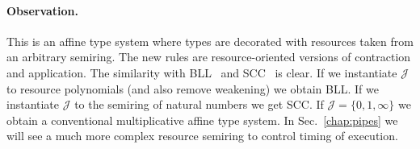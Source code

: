 \documentclass{article}
\begin{document}
\paragraph{Observation.} This is an affine type system where types are
decorated with resources taken from an arbitrary semiring. The new
rules are resource-oriented versions of contraction and application.
The similarity with BLL~\cite{girard1992bounded} and
SCC~\cite{DBLP:journals/tcs/GhicaMO06} is clear. If we instantiate $\mathcal J$ to resource
polynomials (and also remove weakening) we obtain BLL. If we instantiate $\mathcal J$ to the
semiring of natural numbers we get SCC. If $\mathcal J=\{0,1,\infty\}$ we obtain a conventional multiplicative affine type system. 
In Sec.~\ref{chap:pipes} we will see a much more complex resource semiring to control timing of execution. 
\end{document}
